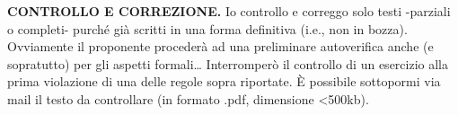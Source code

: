 {\bfseries CONTROLLO E CORREZIONE.} Io controllo e correggo solo testi -parziali o completi- purché già scritti in una forma definitiva (i.e., non in bozza). Ovviamente il proponente procederà ad una preliminare autoverifica anche (e sopratutto) per gli aspetti formali… Interromperò il controllo di un esercizio alla prima violazione di una delle regole sopra riportate. È possibile sottopormi via mail il testo da controllare (in formato .pdf, dimensione <500kb). 

\vfill \eject
\thispagestyle{empty}


